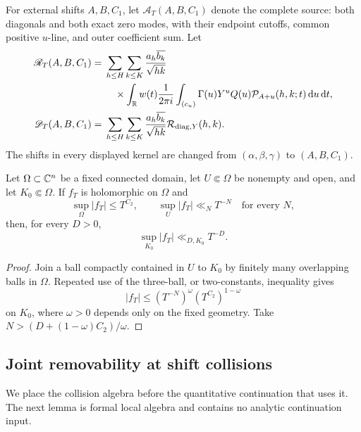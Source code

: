 For external shifts $A,B,C_1$, let $\mathscr A_T(A,B,C_1)$ denote the
complete source: both diagonals and both exact zero modes, with their endpoint
cutoffs, common positive $u$-line, and outer coefficient sum.  Let
\begin{align}
 \mathscr R_T(A,B,C_1)
 ={}&\sum_{h\leq H}\sum_{k\leq K}
 \frac{a_h\overline{b_k}}{\sqrt{hk}}\notag\\
 &\quad\times
 \int_{\mathbb R}w(t)\frac{1}{2\pi i}\int_{(c_u)}
 \Gamma(u)Y^uQ(u)\mathcal P_{A+u}(h,k;t)\,\mathrm d u\,\mathrm d t,
 \label{eq:R-T}\\
 \mathscr D_T(A,B,C_1)
 ={}&\sum_{h\leq H}\sum_{k\leq K}
 \frac{a_h\overline{b_k}}{\sqrt{hk}}
 \mathcal R_{\mathrm{diag},Y}(h,k).
 \label{eq:D-T}
\end{align}
The shifts in every displayed kernel are changed from
$(\alpha,\beta,\gamma)$ to $(A,B,C_1)$.

\begin{lemma}\label{lem:two-constants}
Let $\Omega\subset\mathbb C^n$ be a fixed connected domain, let
$U\Subset\Omega$ be nonempty and open, and let $K_0\Subset\Omega$.  If
$f_T$ is holomorphic on $\Omega$ and
\begin{equation}\label{eq:two-constants-hyp}
 \sup_\Omega|f_T|\leq T^{C_2},
 \qquad
 \sup_U|f_T|\ll_NT^{-N}\quad\text{for every }N,
\end{equation}
then, for every $D>0$,
\begin{equation}\label{eq:two-constants-conclusion}
                         \sup_{K_0}|f_T|\ll_{D,K_0}T^{-D}.
\end{equation}
\end{lemma}

\begin{proof}
Join a ball compactly contained in $U$ to $K_0$ by finitely many overlapping
balls in $\Omega$.  Repeated use of the three-ball, or two-constants,
inequality gives
\[
 |f_T|\leq(T^{-N})^{\omega}(T^{C_2})^{1-\omega}
\]
on $K_0$, where $\omega>0$ depends only on the fixed geometry.  Take
$N>(D+(1-\omega)C_2)/\omega$.
\end{proof}

\subsection{Joint removability at shift collisions}

We place the collision algebra before the quantitative continuation that
uses it.  The next lemma is formal local algebra and contains no analytic
continuation input.

